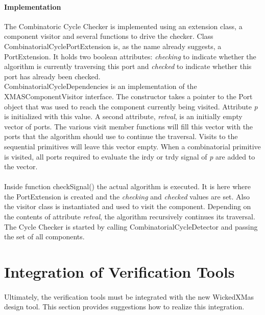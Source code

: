 \documentclass[a4paper,11pt]{article}
\begin{document}
\paragraph{Implementation}
The Combinatoric Cycle Checker is implemented using an extension class, a component visitor
and several functions to drive the checker. Class CombinatorialCyclePortExtension is, as
the name already suggests, a PortExtension. It holds two boolean attributes: \emph{checking} to
indicate whether the algorithm is currently traversing this port and \emph{checked} to indicate
whether this port has already been checked.\\
CombinatorialCycleDependencies is an implementation of the XMASComponentVisitor interface.
The constructor takes a pointer to the Port object that was used to reach the component
currently being visited. Attribute \emph{p} is initialized with this value. A second attribute,
\emph{retval}, is an initially empty vector of ports. The various visit member functions will
fill this vector with the ports that the algorithm should use to continue the traversal. Visits
to the sequential primitives will leave this vector empty. When a combinatorial primitive is
visited, all ports required to evaluate the irdy or trdy signal of \emph{p} are added to the vector.

\paragraph{}
Inside function checkSignal() the actual algorithm is executed. It is here where the PortExtension
is created and the \emph{checking} and \emph{checked} values are set. Also the visitor class
is instantiated and used to visit the component. Depending on the contents of attribute
\emph{retval}, the algorithm recursively continues its traversal. The Cycle Checker is started
by calling CombinatorialCycleDetector and passing the set of all components.

\newpage

\section{Integration of Verification Tools}

\paragraph{}
Ultimately, the verification tools must be integrated with the new WickedXMas design tool.
This section provides suggestions how to realize this integration.
\end{document}
